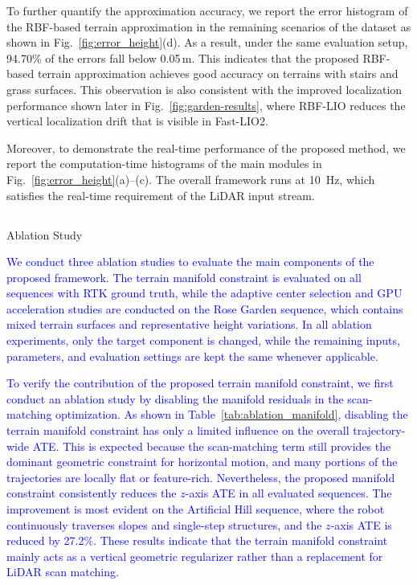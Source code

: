 \documentclass[journal,twoside,web]{ieeecolor}
\makeatletter
\newcommand{\cs}[1]{\textcolor{blue}{#1}}
\let\origsubsection\subsection
\def\subsection{\@ifstar\subsectionstarcolor\subsectioncolorcmd}
\def\subsectioncolorcmd#1{\origsubsection{\textcolor{subsectioncolor}{#1}}}
\def\subsectionstarcolor#1{\origsubsection*{#1}}
\makeatother
\begin{document}
To further quantify the approximation accuracy, we report the error histogram of the RBF-based terrain approximation in the remaining scenarios of the dataset as shown in Fig.~\ref{fig:error_height}(d).
As a result, under the same evaluation setup, 94.70\% of the errors fall below 0.05\,m. This indicates that the proposed RBF-based terrain approximation achieves good accuracy on terrains with stairs and grass surfaces. This observation is also consistent with the improved localization performance shown later in Fig.~\ref{fig:garden-results}, where RBF-LIO reduces the vertical localization drift that is visible in Fast-LIO2.

Moreover, to demonstrate the real-time performance of the proposed method, we report the computation-time histograms of the main modules in Fig.~\ref{fig:error_height}(a)--(c). The overall framework runs at \SI{10}{\hertz}, which satisfies the real-time requirement of the LiDAR input stream.

\subsection{Ablation Study}

\cs{We conduct three ablation studies to evaluate the main components of the proposed framework. The terrain manifold constraint is evaluated on all sequences with RTK ground truth, while the adaptive center selection and GPU acceleration studies are conducted on the Rose Garden sequence, which contains mixed terrain surfaces and representative height variations. In all ablation experiments, only the target component is changed, while the remaining inputs, parameters, and evaluation settings are kept the same whenever applicable.}

\cs{To verify the contribution of the proposed terrain manifold constraint, we first conduct an ablation study by disabling the manifold residuals in the scan-matching optimization. As shown in Table~\ref{tab:ablation_manifold}, disabling the terrain manifold constraint has only a limited influence on the overall trajectory-wide ATE. This is expected because the scan-matching term still provides the dominant geometric constraint for horizontal motion, and many portions of the trajectories are locally flat or feature-rich. Nevertheless, the proposed manifold constraint consistently reduces the $z$-axis ATE in all evaluated sequences. The improvement is most evident on the Artificial Hill sequence, where the robot continuously traverses slopes and single-step structures, and the $z$-axis ATE is reduced by 27.2\%. These results indicate that the terrain manifold constraint mainly acts as a vertical geometric regularizer rather than a replacement for LiDAR scan matching.}
\end{document}
